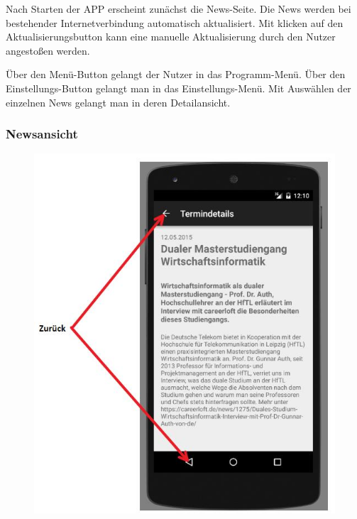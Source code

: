 
Nach Starten der APP erscheint zunächst die News-Seite. Die News werden bei bestehender Internetverbindung automatisch aktualisiert. Mit klicken auf den Aktualisierungsbutton kann eine manuelle Aktualisierung durch den Nutzer angestoßen werden.

Über den Menü-Button gelangt der Nutzer in das Programm-Menü. Über den Einstellungs-Button gelangt man in das Einstellungs-Menü.
Mit Auswählen der einzelnen News gelangt man in deren Detailansicht.

\newpage
\subsubsection{Newsansicht}
\begin{figure}[h]
	\centering
	\includegraphics[scale=0.8]{03_Bedienungsanleitung/img/news.jpg}
	\label{img:grafik-dummy}
\end{figure}

